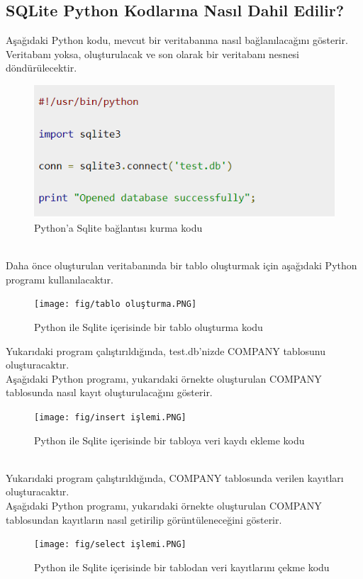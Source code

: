 \subsection{SQLite Python Kodlarına Nasıl Dahil Edilir?}
Aşağıdaki Python kodu, mevcut bir veritabanına nasıl bağlanılacağını gösterir. Veritabanı yoksa, oluşturulacak ve son olarak bir veritabanı nesnesi döndürülecektir.
\begin{figure}
    \centering
    \includegraphics{fig/sql bağlantısı.PNG}
    \caption{Python'a Sqlite bağlantısı kurma kodu}
    \label{fig:my_label}
\end{figure} \\
Daha önce oluşturulan veritabanında bir tablo oluşturmak için aşağıdaki Python programı kullanılacaktır.
\begin{figure}
    \centering
    \texttt{[image: fig/tablo oluşturma.PNG]}
    \caption{Python ile Sqlite içerisinde bir tablo oluşturma kodu}
    \label{fig:my_label}
\end{figure}
Yukarıdaki program çalıştırıldığında, test.db'nizde COMPANY tablosunu oluşturacaktır. \\
Aşağıdaki Python programı, yukarıdaki örnekte oluşturulan COMPANY tablosunda nasıl kayıt oluşturulacağını gösterir.
\begin{figure}
    \centering
    \texttt{[image: fig/insert işlemi.PNG]}
    \caption{Python ile Sqlite içerisinde bir tabloya veri kaydı ekleme kodu}
    \label{fig:my_label}
\end{figure}\\
Yukarıdaki program çalıştırıldığında, COMPANY tablosunda verilen kayıtları oluşturacaktır.\\
Aşağıdaki Python programı, yukarıdaki örnekte oluşturulan COMPANY tablosundan kayıtların nasıl getirilip görüntüleneceğini gösterir.
\begin{figure}
    \centering
    \texttt{[image: fig/select işlemi.PNG]}
    \caption{Python ile Sqlite içerisinde bir tablodan veri kayıtlarını çekme kodu}
    \label{fig:my_label}
\end{figure} \\
